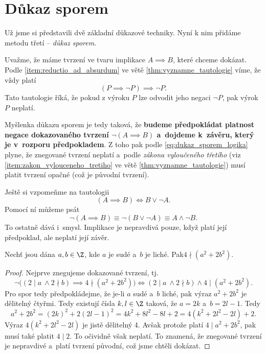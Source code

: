 \section{Důkaz sporem}\label{sec:dukaz_sporem}
Už jsme si představili dvě základní důkazové techniky. Nyní k nim přidáme metodu třetí -- \emph{důkaz sporem}.\par
Uvažme, že máme tvrzení ve tvaru implikace $A \implies B$, které chceme dokázat. Podle \ref{item:reductio_ad_absurdum} ve větě \ref{thm:vyznamne_tautologie} víme, že vždy platí
\begin{equation}\label{eq:dukaz_sporem_logika}
    (P \implies \neg P) \implies \neg P.
\end{equation}
Tato tautologie říká, že pokud z výroku $P$ lze odvodit jeho negaci $\neg P$, pak výrok $P$ neplatí.\par
Myšlenka důkazu sporem je tedy taková, že \textbf{budeme předpokládat platnost negace dokazovaného tvrzení $\neg (A \implies B)$ a~dojdeme k~závěru, který je v~rozporu předpokladem}. Z toho pak podle \eqref{eq:dukaz_sporem_logika} plyne, že znegované tvrzení neplatí a~podle \emph{zákona vyloučeného třetího} (viz \ref{item:zakon_vylouceneho_tretiho} ve větě \ref{thm:vyznamne_tautologie}) musí platit tvrzení opačné (což je původní tvrzení).\par
Ještě si vzpomeňme na tautologii
\begin{equation*}
    (A \implies B) \iff B \lor \neg A.
\end{equation*}
Pomocí ní můžeme psát
\begin{equation*}
    \neg (A \implies B) \equiv \neg (B \lor \neg A) \equiv A \land \neg B.
\end{equation*}
To ostatně dává i~smysl. Implikace je nepravdivá pouze, když platí její předpoklad, ale neplatí její závěr.
\begin{proposition}
    Nechť jsou dána $a,b\in\Z$, kde $a$ je sudé a~$b$ je liché. Pak\linebreak $4 \nmid (a^2+2b^2)$.
\end{proposition}
\begin{proof}
    Nejprve znegujeme dokazované tvrzení, tj.
    \begin{equation*}
        \neg \bigl((2 \mid a~\land 2 \nmid b) \implies 4 \nmid (a^2+2b^2)\bigr) \iff (2 \mid a~\land 2 \nmid b) \land 4 \mid (a^2+2b^2).
    \end{equation*}
    Pro spor tedy předpokládejme, že je-li $a$ sudé a~$b$ liché, pak výraz $a^2+2b^2$ je dělitelný čtyřmi. Tedy existují čísla $k,l\in\Z$ taková, že $a=2k$ a~$b=2l-1$. Tedy
    \begin{equation*}
        a^2+2b^2=(2k)^2+2(2l-1)^2=4k^2+8l^2-8l+2=4(k^2+2l^2-2l)+2.
    \end{equation*}
    Výraz $4(k^2+2l^2-2l)$ je jistě dělitelný 4. Avšak protože platí $4 \mid a^2+2b^2$, pak musí také platit $4 \mid 2$. To očividně však neplatí. To znamená, že znegované tvrzení je nepravdivé a~platí tvrzení původní, což jsme chtěli dokázat.
\end{proof}

